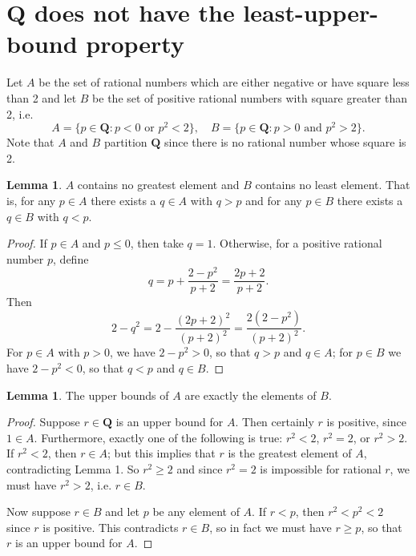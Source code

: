 \documentclass[12pt]{article}
\theoremstyle{definition}
\newtheorem{lemma}[theorem]{Lemma}
\newcommand{\Q}{\mathbf{Q}}
\begin{document}
\section{\texorpdfstring{\( \Q \)}{} does not have the least-upper-bound property}

Let \( A \) be the set of rational numbers which are either negative or have square less than 2 and let \( B \) be the set of positive rational numbers with square greater than 2, i.e.
\[
    A = \{ p \in \Q : p < 0 \text{ or } p^2 < 2 \}, \quad B = \{ p \in \Q : p > 0 \text{ and } p^2 > 2 \}.
\]
Note that \( A \) and \( B \) partition \( \Q \) since there is no rational number whose square is 2.

\begin{lemma}
\label{lem:no_greatest/least_element}
    \( A \) contains no greatest element and \( B \) contains no least element. That is, for any \( p \in A \) there exists a \( q \in A \) with \( q > p \) and for any \( p \in B \) there exists a \( q \in B \) with \( q < p \).
\end{lemma}

\begin{proof}
    If \( p \in A \) and \( p \leq 0 \), then take \( q = 1 \). Otherwise, for a positive rational number \( p \), define
    \[ q = p + \frac{2 - p^2}{p + 2} = \frac{2p + 2}{p + 2}. \]
    Then
    \[ 2 - q^2 = 2 - \frac{(2p + 2)^2}{(p+2)^2} = \frac{2(2 - p^2)}{(p + 2)^2}. \]
    For \( p \in A \) with \( p > 0 \), we have \( 2 - p^2 > 0 \), so that \( q > p \) and \( q \in A \); for \( p \in B \) we have \( 2 - p^2 < 0 \), so that \( q < p \) and \( q \in B \).
\end{proof}

\begin{lemma}
\label{lem:set_of_upper_bounds_of_A_is_B}
    The upper bounds of \( A \) are exactly the elements of \( B \).
\end{lemma}

\begin{proof}
    Suppose \( r \in \Q \) is an upper bound for \( A \). Then certainly \( r \) is positive, since \( 1 \in A \). Furthermore, exactly one of the following is true: \( r^2 < 2 \), \( r^2 = 2 \), or \( r^2 > 2 \). If \( r^2 < 2 \), then \( r \in A \); but this implies that \( r \) is the greatest element of \( A \), contradicting Lemma 1. So \( r^2 \geq 2 \) and since \( r^2 = 2 \) is impossible for rational \( r \), we must have \( r^2 > 2 \), i.e. \( r \in B \).
    
    Now suppose \( r \in B \) and let \( p \) be any element of \( A \). If \( r < p \), then \( r^2 < p^2 < 2 \) since \( r \) is positive. This contradicts \( r \in B \), so in fact we must have \( r \geq p \), so that \( r \) is an upper bound for \( A \).
\end{proof}
\end{document}
